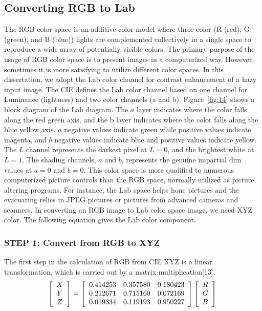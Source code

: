 \documentclass[doctor,english,listoffigures,listoftables]{thesis-uestc}
\begin{document}
\subsection{Converting RGB to Lab}
The RGB color space is an additive color model where three color (R (red), G (green), and B (blue)) lights are complemented collectively in a single space to reproduce a wide array of potentially visible colors. The primary purpose of the usage of RGB color space is to present images in a computerized way. However, sometimes it is more satisfying to utilize different color spaces. In this dissertation, we adopt the Lab color channel for contrast enhancement of a hazy input image. 
The CIE defines the Lab color channel based on one channel for Luminance (lightness) and two color channels (a and b). Figure~\ref{fig:14} shows a block diagram of the Lab diagram. The $a$ layer indicates where the color falls along the red green axis, and the b layer indicates where the color falls along the blue yellow axis. $a$ negative values indicate green while positive values indicate magenta, and $b$ negative values indicate blue and positive values indicate yellow. The $L$ channel represents the darkest pixel at $L = 0$, and the brightest white at $L = 1$. The shading channels, $a$ and $b$, represents the genuine impartial dim values at $a = 0$ and $b = 0$. This color space is more qualified to numerous computerized picture controls than the RGB space, normally utilized as picture altering programs. For instance, the Lab space helps hone pictures and the evacuating relics in JPEG pictures or pictures from advanced cameras and scanners. In converting an RGB image to Lab color space image, we need XYZ color. The following equation gives the Lab color component.

\subsubsection{STEP 1: Convert from RGB to XYZ}
The first step in the calculation of RGB from CIE XYZ is a linear transformation, which is carried out by a matrix multiplication[13].\\
\begin{equation}
\left[\begin{array}{ccc}
X \\
Y \\
Z\end{array} \right] = \left[ \begin{array}{ccc}
0.414253 & 0.357580 & 0.180423 \\
0.212671 & 0.715160 & 0.072169 \\
0.019334 & 0.119193 & 0.950227 \end{array} \right] \left[ \begin{array}{ccc}
R \\
G \\
B \end{array} \right] \\
\end{equation}
\end{document}

